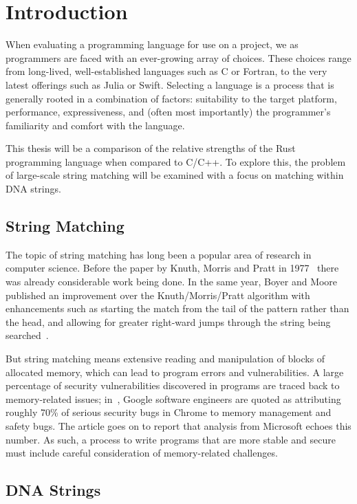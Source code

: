 \section{Introduction}
\label{sec:introduction}

When evaluating a programming language for use on a project, we as programmers are faced with an ever-growing array of choices. These choices range from long-lived, well-established languages such as C or Fortran, to the very latest offerings such as Julia or Swift. Selecting a language is a process that is generally rooted in a combination of factors: suitability to the target platform, performance, expressiveness, and (often most importantly) the programmer's familiarity and comfort with the language.

This thesis will be a comparison of the relative strengths of the Rust programming language when compared to C/C++. To explore this, the problem of large-scale string matching will be examined with a focus on matching within DNA strings.

\subsection{String Matching}

The topic of string matching has long been a popular area of research in computer science. Before the paper by Knuth, Morris and Pratt in 1977~\cite{knuth.morris.pratt.1977} there was already considerable work being done. In the same year, Boyer and Moore published an improvement over the Knuth/Morris/Pratt algorithm with enhancements such as starting the match from the tail of the pattern rather than the head, and allowing for greater right-ward jumps through the string being searched~\cite{boyer.moore.1977}.

But string matching means extensive reading and manipulation of blocks of allocated memory, which can lead to program errors and vulnerabilities. A large percentage of security vulnerabilities discovered in programs are traced back to memory-related issues; in~\cite{cimpanu.2020}, Google software engineers are quoted as attributing roughly 70\% of serious security bugs in Chrome to memory management and safety bugs. The article goes on to report that analysis from Microsoft echoes this number. As such, a process to write programs that are more stable and secure must include careful consideration of memory-related challenges.

\subsection{DNA Strings}


